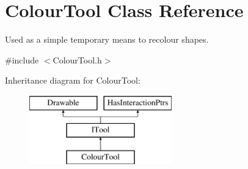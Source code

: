 \hypertarget{class_colour_tool}{}\section{Colour\+Tool Class Reference}
\label{class_colour_tool}


Used as a simple temporary means to recolour shapes.  




{\ttfamily \#include $<$Colour\+Tool.\+h$>$}

Inheritance diagram for Colour\+Tool\+:\begin{figure}[H]
\begin{center}
\leavevmode
\includegraphics[height=3.000000cm]{class_colour_tool}
\end{center}
\end{figure}
